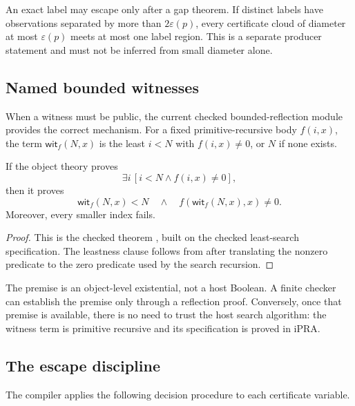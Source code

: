 An exact label may escape only after a gap theorem.  If distinct labels have observations separated
by more than \(2\varepsilon(p)\), every certificate cloud of diameter at most \(\varepsilon(p)\)
meets at most one label region.  This is a separate producer statement and must not be inferred from
small diameter alone.

\subsection{Named bounded witnesses}

When a witness must be public, the current checked bounded-reflection module provides the correct
mechanism.  For a fixed primitive-recursive body \(f(i,x)\), the term
\(\mathsf{wit}_f(N,x)\) is the least \(i<N\) with \(f(i,x)\ne0\), or \(N\) if none exists.

\begin{theorem}\label{thm:named}
If the object theory proves
\[
  \exists i\,[i<N\land f(i,x)\ne0],
\]
then it proves
\[
  \mathsf{wit}_f(N,x)<N
  \quad\land\quad
  f(\mathsf{wit}_f(N,x),x)\ne0.
\]
Moreover, every smaller index fails.
\end{theorem}

\begin{proof}
This is the checked theorem , built on the checked least-search
specification.  The leastness clause follows from  after translating the
nonzero predicate to the zero predicate used by the search recursion.
\end{proof}

\begin{remark}
The premise is an object-level existential, not a host Boolean.  A finite checker can establish the
premise only through a reflection proof.  Conversely, once that premise is available, there is no
need to trust the host search algorithm: the witness term is primitive recursive and its
specification is proved in iPRA.
\end{remark}

\subsection{The escape discipline}

The compiler applies the following decision procedure to each certificate variable.

